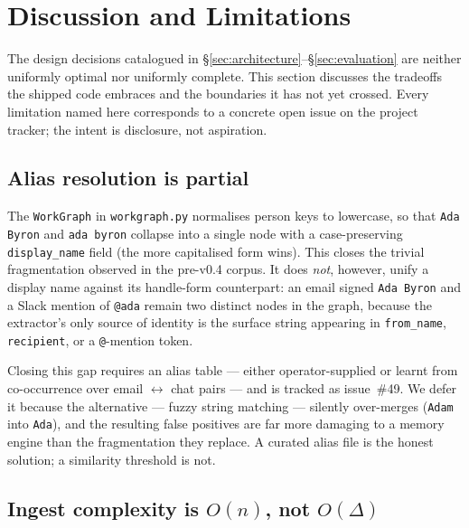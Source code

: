 
\section{Discussion and Limitations}
\label{sec:discussion}

The design decisions catalogued in \S\ref{sec:architecture}--\S\ref{sec:evaluation} are neither uniformly optimal nor uniformly complete. This section discusses the tradeoffs the shipped code embraces and the boundaries it has not yet crossed. Every limitation named here corresponds to a concrete open issue on the project tracker; the intent is disclosure, not aspiration.

\subsection{Alias resolution is partial}
\label{sec:limit-alias}

The \texttt{WorkGraph} in \texttt{workgraph.py} normalises person keys to lowercase, so that \texttt{Ada Byron} and \texttt{ada byron} collapse into a single node with a case-preserving \texttt{display\_name} field (the more capitalised form wins). This closes the trivial fragmentation observed in the pre-v0.4 corpus. It does \emph{not}, however, unify a display name against its handle-form counterpart: an email signed \texttt{Ada Byron} and a Slack mention of \texttt{@ada} remain two distinct nodes in the graph, because the extractor's only source of identity is the surface string appearing in \texttt{from\_name}, \texttt{recipient}, or a \verb|@|-mention token.

Closing this gap requires an alias table --- either operator-supplied or learnt from co-occurrence over email $\leftrightarrow$ chat pairs --- and is tracked as issue~\#49. We defer it because the alternative --- fuzzy string matching --- silently over-merges (\texttt{Adam} into \texttt{Ada}), and the resulting false positives are far more damaging to a memory engine than the fragmentation they replace. A curated alias file is the honest solution; a similarity threshold is not.

\subsection{Ingest complexity is $O(n)$, not $O(\Delta)$}
\label{sec:limit-full-rebuild}

